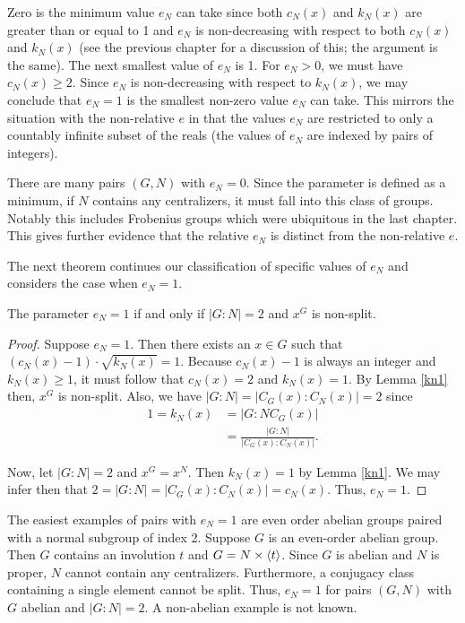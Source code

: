 \documentclass[main.tex]{subfiles}
\begin{document}
Zero is the minimum value $e_N$ can take since both $c_N(x)$ and $k_N(x)$ are greater than or equal to 1 and $e_N$ is non-decreasing with respect to both $c_N(x)$ and $k_N(x)$ (see the previous chapter for a discussion of this; the argument is the same). The next smallest value of $e_N$ is 1. For $e_N > 0$, we must have $c_N(x) \ge 2$. Since $e_N$ is non-decreasing with respect to $k_N(x)$, we may conclude that $e_N = 1$ is the smallest non-zero value $e_N$ can take. This mirrors the situation with the non-relative $e$ in that the values $e_N$ are restricted to only a countably infinite subset of the reals (the values of $e_N$ are indexed by pairs of integers).

There are many pairs $(G, N)$ with $e_N = 0$. Since the parameter is defined as a minimum, if $N$ contains any centralizers, it must fall into this class of groups. Notably this includes Frobenius groups which were ubiquitous in the last chapter. This gives further evidence that the relative $e_N$ is distinct from the non-relative $e$.

The next theorem continues our classification of specific values of $e_N$ and considers the case when $e_N = 1$.

\begin{theorem}\label{en1}
The parameter $e_N = 1$ if and only if $|G:N| = 2$ and $x^G$ is non-split.
\end{theorem}

\begin{proof}
Suppose $e_N = 1$. Then there exists an $x \in G$ such that $(c_N(x) - 1) \cdot \sqrt{k_N(x)} = 1$. Because $c_N(x) - 1$ is always an integer and $k_N(x) \ge 1$, it must follow that $c_N(x) = 2$ and $k_N(x) = 1$. By Lemma \ref{kn1} then, $x^G$ is non-split. Also, we have $|G : N| = |C_G(x) : C_N(x)| = 2$ since
\begin{align*}
1 = k_N(x) &= |G : NC_G(x)| \\
&= \frac{|G : N|}{|C_G(x) : C_N(x)|} \text{.}
\end{align*}

Now, let $|G:N| = 2$ and $x^G = x^N$. Then $k_N(x) = 1$ by Lemma \ref{kn1}. We may infer then that $2 = |G : N| = |C_G(x) : C_N(x)| = c_N(x)$. Thus, $e_N = 1$. 
\end{proof}

The easiest examples of pairs with $e_N = 1$ are even order abelian groups paired with a normal subgroup of index 2. Suppose $G$ is an even-order abelian group. Then $G$ contains an involution $t$ and $G = N \times \langle t \rangle$. Since $G$ is abelian and $N$ is proper, $N$ cannot contain any centralizers. Furthermore, a conjugacy class containing a single element cannot be split. Thus, $e_N = 1$ for pairs $(G, N)$ with $G$ abelian and $|G : N| = 2$. A non-abelian example is not known.
\end{document}

